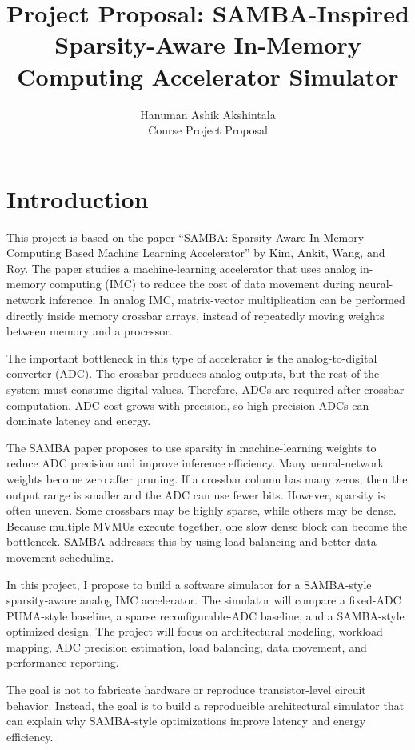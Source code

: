 \documentclass[11pt]{article}
\title{\textbf{Project Proposal: SAMBA-Inspired Sparsity-Aware In-Memory Computing Accelerator Simulator}}
\author{Hanuman Ashik Akshintala\\Course Project Proposal}
\date{}
\begin{document}
\maketitle

\section{Introduction}

This project is based on the paper ``SAMBA: Sparsity Aware In-Memory Computing Based Machine Learning Accelerator'' by Kim, Ankit, Wang, and Roy. The paper studies a machine-learning accelerator that uses analog in-memory computing (IMC) to reduce the cost of data movement during neural-network inference. In analog IMC, matrix-vector multiplication can be performed directly inside memory crossbar arrays, instead of repeatedly moving weights between memory and a processor.

The important bottleneck in this type of accelerator is the analog-to-digital converter (ADC). The crossbar produces analog outputs, but the rest of the system must consume digital values. Therefore, ADCs are required after crossbar computation. ADC cost grows with precision, so high-precision ADCs can dominate latency and energy.

The SAMBA paper proposes to use sparsity in machine-learning weights to reduce ADC precision and improve inference efficiency. Many neural-network weights become zero after pruning. If a crossbar column has many zeros, then the output range is smaller and the ADC can use fewer bits. However, sparsity is often uneven. Some crossbars may be highly sparse, while others may be dense. Because multiple MVMUs execute together, one slow dense block can become the bottleneck. SAMBA addresses this by using load balancing and better data-movement scheduling.

In this project, I propose to build a software simulator for a SAMBA-style sparsity-aware analog IMC accelerator. The simulator will compare a fixed-ADC PUMA-style baseline, a sparse reconfigurable-ADC baseline, and a SAMBA-style optimized design. The project will focus on architectural modeling, workload mapping, ADC precision estimation, load balancing, data movement, and performance reporting.

The goal is not to fabricate hardware or reproduce transistor-level circuit behavior. Instead, the goal is to build a reproducible architectural simulator that can explain why SAMBA-style optimizations improve latency and energy efficiency.
\end{document}

